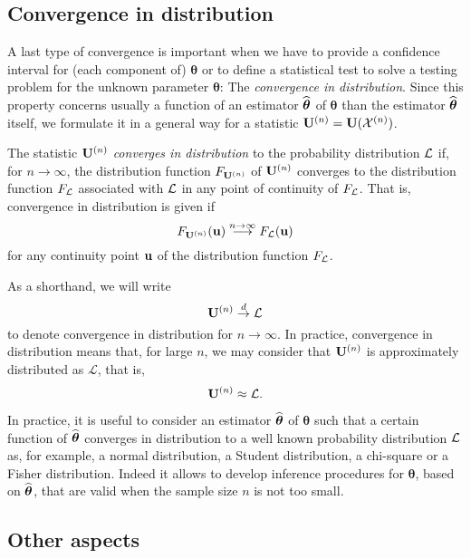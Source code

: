 \subsection{Convergence in distribution}

A last type of convergence is important when we have to provide a confidence interval for (each component of) $\boldsymbol\theta$ or to define a statistical test to solve a testing problem for the unknown parameter $\boldsymbol\theta$: The \emph{convergence in distribution}. Since this property concerns usually a function of an estimator $\widehat{\boldsymbol\theta}$ of $\boldsymbol\theta$ than the estimator $\widehat{\boldsymbol\theta}$ itself, we formulate it in a general way for a statistic $\mathbf U^{(n)}=\mathbf U({\cal X}^{(n)})$.

The statistic $\mathbf U^{(n)}$ \emph{converges in distribution} to the probability distribution ${\cal L}$ if, for $n \rightarrow \infty$, the distribution function $F_{\mathbf U^{(n)}}$ of $\mathbf U^{(n)}$ converges to the distribution function $F_{\cal L}$ associated with ${\cal L}$ in any point of continuity of $F_{\cal L}$. That is, convergence in distribution is given if
\[
	F_{\mathbf U^{(n)}}(\mathbf u) \stackrel{n \rightarrow \infty}{\longrightarrow} F_{\cal L}(\mathbf u)
\] 
for any continuity point $\mathbf u$ of the distribution function $F_{\cal L}$.

As a shorthand, we will write
\[
    \mathbf U^{(n)} \stackrel{d}{\rightarrow} \mathcal{L}
\]
to denote convergence in distribution for $n \rightarrow \infty$. In practice, 
convergence in distribution means that, for large $n$, we may consider that
$\mathbf U^{(n)}$ is approximately distributed as $\mathcal{L}$, that is,
\[
    \mathbf U^{(n)} \approx \mathcal{L}.
\]

In practice, it is useful to consider an estimator $\widehat{\boldsymbol\theta}$ of $\boldsymbol\theta$ such that a certain function of $\widehat{\boldsymbol\theta}$ converges in distribution to a well known probability distribution ${\cal L}$ as, for example, a normal distribution, a Student distribution, a chi-square or a Fisher distribution. Indeed it allows to develop inference procedures for $\boldsymbol\theta$, based on $\widehat{\boldsymbol\theta}$, that are valid when the sample size $n$ is not too small.

\subsection{Other aspects}

